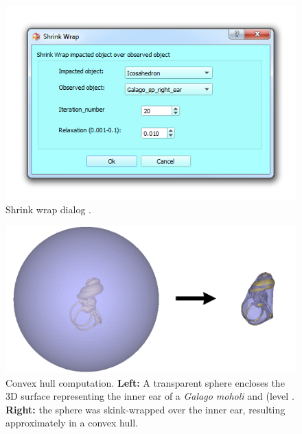 \begin{figure}
  \centering
  \includegraphics[scale=0.5]{images/09/wrapping_methods/shrink_wrap_dialog.png} 
	\caption{Shrink wrap dialog .}
\label{shrink_wrap_dialog}
 
\end{figure}

\begin{figure}
  \centering
  \includegraphics[scale=0.45]{images/09/wrapping_methods/shrink_wrap_example.png} 
	\caption{Convex hull computation. \textbf{Left:} A transparent sphere encloses the 3D surface representing the inner ear of a \textit{Galago moholi} and (level . \textbf{Right:} the sphere was skink-wrapped over the inner ear, resulting approximately in a convex hull.}
\label{shrink_wrap_example}
 
\end{figure}

